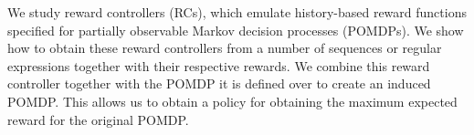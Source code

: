 We study reward controllers (RCs), which emulate history-based reward functions specified for partially observable Markov decision processes (POMDPs). We show how to obtain these reward controllers from a number of sequences or regular expressions together with their respective rewards. We combine this reward controller together with the POMDP it is defined over to create an induced POMDP. This allows us to obtain a policy for obtaining the maximum expected reward for the original POMDP. 